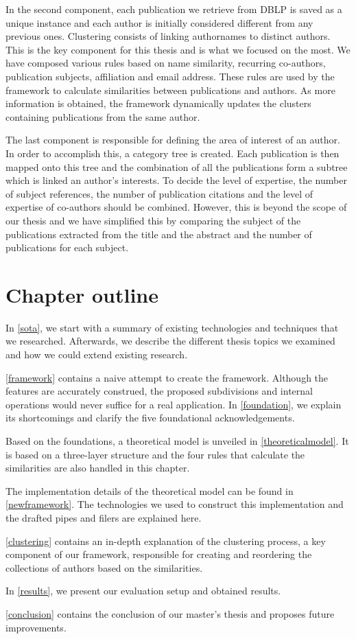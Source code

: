 In the second component, each publication we retrieve from DBLP is saved as a unique instance and each author is initially considered different from any previous ones. Clustering consists of linking authornames to distinct authors. This is the key component for this thesis and is what we focused on the most. We have composed various rules based on name similarity, recurring co-authors, publication subjects, affiliation and email address. These rules are used by the framework to calculate similarities between publications and authors. As more information is obtained, the framework dynamically updates the clusters containing publications from the same author.

The last component is responsible for defining the area of interest of an author. In order to accomplish this, a category tree is created. Each publication is then mapped onto this tree and the combination of all the publications form a subtree which is linked an author's interests. To decide the level of expertise, the number of subject references, the number of publication citations and the level of expertise of co-authors should be combined. However, this is beyond the scope of our thesis and we have simplified this by comparing the subject of the publications extracted from the title and the abstract and the number of publications for each subject.

\section{Chapter outline}

In \autoref{sota}, we start with a summary of existing technologies and techniques that we researched. Afterwards, we describe the different thesis topics we examined and how we could extend existing research. 

\autoref{framework} contains a naive attempt to create the framework. Although the features are accurately construed, the proposed subdivisions and internal operations would never suffice for a real application. In \autoref{foundation}, we explain its shortcomings and clarify the five foundational acknowledgements.

Based on the foundations, a theoretical model is unveiled in \autoref{theoreticalmodel}. It is based on a three-layer structure and the four rules that calculate the similarities are also handled in this chapter.

The implementation details of the theoretical model can be found in \autoref{newframework}. The technologies we used to construct this implementation and the drafted pipes and filers are explained here.

\autoref{clustering} contains an in-depth explanation of the clustering process, a key component of our framework, responsible for creating and reordering the collections of authors based on the similarities.

In \autoref{results}, we present our evaluation setup and obtained results.

\autoref{conclusion} contains the conclusion of our master's thesis and proposes future improvements.
